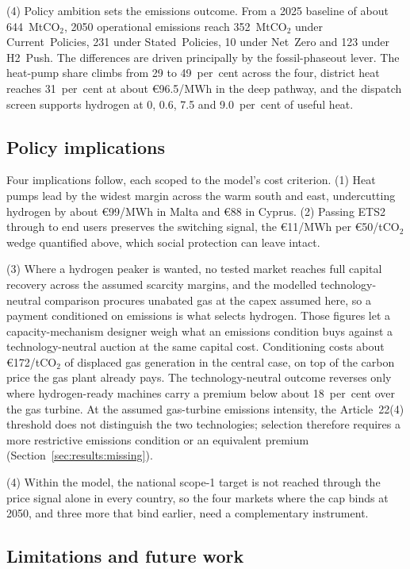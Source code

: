 (4) Policy ambition sets the emissions outcome. From a 2025 baseline of about
644~MtCO$_2$, 2050 operational emissions reach 352~MtCO$_2$ under Current~Policies,
231 under Stated~Policies, 10 under Net~Zero and 123 under H2~Push. The differences are
driven principally by the fossil-phaseout lever. The heat-pump share climbs from 29 to 49~per~cent across the four, district heat reaches 31~per~cent at about \euro{}96.5/MWh in the deep pathway, and the dispatch screen supports hydrogen at 0, 0.6, 7.5 and 9.0~per~cent of useful heat.

\subsection{Policy implications}

Four implications follow, each scoped to the model's cost criterion. (1) Heat pumps lead by the widest margin across the warm south and east, undercutting hydrogen by about \euro{}99/MWh in Malta and \euro{}88 in Cyprus. (2) Passing ETS2 through to end
users preserves the switching signal, the \euro{}11/MWh per \euro{}50/tCO$_2$ wedge
quantified above, which social protection can leave intact.

(3) Where a hydrogen peaker is wanted, no tested market reaches full capital recovery across the assumed scarcity margins, and the modelled technology-neutral comparison procures unabated gas at the capex assumed here, so a payment conditioned on emissions is what selects hydrogen. Those figures let a capacity-mechanism designer weigh what an emissions condition buys against a technology-neutral auction at the same capital cost. Conditioning costs about
\euro{}172/tCO$_2$ of displaced gas generation in the central case, on top of the carbon
price the gas plant already pays. The technology-neutral
outcome reverses only where hydrogen-ready
machines carry a premium below about 18~per~cent over the gas turbine. At the assumed
gas-turbine emissions intensity, the Article~22(4) threshold does not distinguish the two
technologies; selection therefore requires a more restrictive emissions condition or an
equivalent premium (Section~\ref{sec:results:missing}).

(4) Within the model, the national scope-1 target is not reached through the price signal
alone in every country, so the four markets where the cap binds at 2050, and three more
that bind earlier, need a complementary instrument.

\subsection{Limitations and future work}

